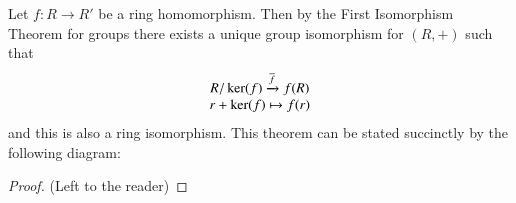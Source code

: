 \documentclass[12pt, a4paper, oneside, openright, titlepage]{book}
\begin{document}
\begin{namthm}\label{thmname:isoring}
    Let $f:R\rightarrow R'$ be a ring homomorphism. Then by the First Isomorphism Theorem for groups there exists a unique group isomorphism for $(R,+)$ such that \begin{equation}
        \begin{array}{c} R/\ker(f) \xrightarrow{\overline{f}}f(R) \\ r+\ker(f) \mapsto f(r) \end{array}
    \end{equation}
    and this is also a ring isomorphism. This theorem can be stated succinctly by the following diagram:
    \begin{center}
        \end{center}
\end{namthm}
\begin{proof}
    (Left to the reader)
\end{proof}
\end{document}
